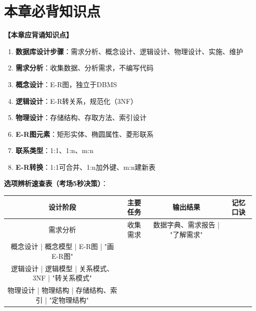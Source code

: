 \documentclass[12pt, a4paper]{article}
\newenvironment{bluebox}[1]{%
  \begin{trivlist}
  \item[\hskip\labelsep \textbf{#1}]
  \setlength{\parskip}{0.5ex}
  \setlength{\itemsep}{0.5ex}
}{%
  \end{trivlist}
  }
\begin{document}
\section{本章必背知识点}

\begin{bluebox}{命题人思维版}
	\textbf{【本章应背诵知识点】}

	\begin{enumerate}[leftmargin=*, label=\textbf{\arabic*.}]
		\item \textbf{数据库设计步骤}：需求分析、概念设计、逻辑设计、物理设计、实施、维护
		\item \textbf{需求分析}：收集数据、分析需求，不编写代码
		\item \textbf{概念设计}：E-R图，独立于DBMS
		\item \textbf{逻辑设计}：E-R转关系，规范化（3NF）
		\item \textbf{物理设计}：存储结构、存取方法、索引设计
		\item \textbf{E-R图元素}：矩形实体、椭圆属性、菱形联系
		\item \textbf{联系类型}：1:1、1:n、m:n
		\item \textbf{E-R转换}：1:1可合并、1:n加外键、m:n建新表
	\end{enumerate}

	\textbf{选项辨析速查表（考场5秒决策）}：

	\begin{tabular}{|c|c|c|c|}
		\hline
		\textbf{设计阶段} & \textbf{主要任务} & \textbf{输出结果}      & \textbf{记忆口诀} \\
		\hline
		需求分析          & 收集需求          & 数据字典、需求报告 | "了解需求"                 \\
		\hline
		概念设计 | 概念模型 | E-R图 | "画E-R图"                                       \\
		\hline
		逻辑设计 | 逻辑模型 | 关系模式、3NF | "转关系模式"                                   \\
		\hline
		物理设计 | 物理结构 | 存储结构、索引 | "定物理结构"                                    \\
		\hline
	\end{tabular}
\end{bluebox}
\end{document}
